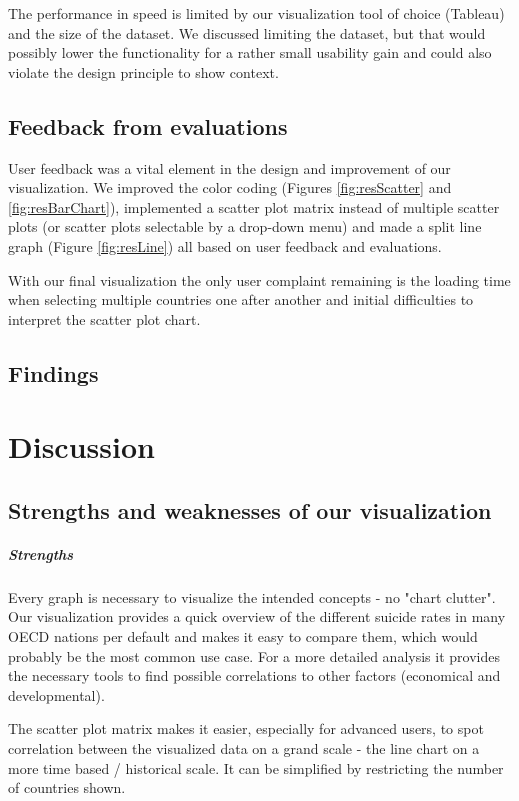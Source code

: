 \documentclass{vgtc}                          %
\begin{document}
The performance in speed is limited by our visualization tool of choice (Tableau) and the size of the dataset. We discussed limiting the dataset, but that would possibly lower the functionality for a rather small usability gain and could also violate the design principle to show context.

\subsection{Feedback from evaluations}
User feedback was a vital element in the design and improvement of our visualization. We improved the color coding (Figures \ref{fig:resScatter} and \ref{fig:resBarChart}), implemented a scatter plot matrix instead of multiple scatter plots (or scatter plots selectable by a drop-down menu) and made a split line graph (Figure \ref{fig:resLine}) all based on user feedback and evaluations.

With our final visualization the only user complaint remaining is the loading time when selecting multiple countries one after another and initial difficulties to interpret the scatter plot chart.

\subsection{Findings}


\section{Discussion}

\subsection{Strengths and weaknesses of our visualization}

\subparagraph{Strengths}
Every graph is necessary to visualize the intended concepts - no "chart clutter". Our visualization provides a quick overview of the different suicide rates in many OECD nations per default and makes it easy to compare them, which would probably be the most common use case. For a more detailed analysis it provides the necessary tools to find possible correlations to other factors (economical and developmental).

The scatter plot matrix makes it easier, especially for advanced users, to spot correlation between the visualized data on a grand scale - the line chart on a more time based / historical scale. It can be simplified by restricting the number of countries shown.
\end{document}
